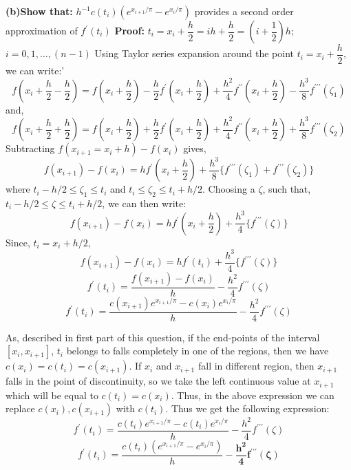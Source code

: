 \documentclass{article}
\renewcommand\part[1]{\vspace{.10in}\textbf{(#1)}}
\begin{document}
  \part{b}\textbf {Show that:} $h^{-1}c(t_i)(e^{x_{i+1}/\pi} - e^{x_i/\pi})$ provides a second order approximation of $f^\prime(t_i)$ \newline
  \textbf{Proof:} $t_i = x_i + \dfrac{h}{2} = ih + \dfrac{h}{2} = (i + \dfrac{1}{2})h$; $i=0,1,\dots,(n-1)$ \newline
  Using Taylor series expansion around the point $t_i = x_i + \dfrac{h}{2}$, we can write:'
  \[f(x_i + \dfrac{h}{2} - \dfrac{h}{2}) = f(x_i + \dfrac{h}{2}) - \dfrac{h}{2}f^\prime(x_i + \dfrac{h}{2}) + \dfrac{h^2}{4}f^{\prime\prime}(x_i + \dfrac{h}{2}) - \dfrac{h^3}{8}f^{\prime\prime\prime}(\zeta_1)\]
  and, 
  \[f(x_i + \dfrac{h}{2} + \dfrac{h}{2}) = f(x_i + \dfrac{h}{2}) + \dfrac{h}{2}f^\prime(x_i + \dfrac{h}{2}) + \dfrac{h^2}{4}f^{\prime\prime}(x_i + \dfrac{h}{2}) + \dfrac{h^3}{8}f^{\prime\prime\prime}(\zeta_2)\]
  Subtracting $f(x_{i+1}=x_i+h) - f(x_{i})$ gives, 
  \[ f(x_{i+1}) - f(x_i) = hf^\prime(x_i + \dfrac{h}{2}) + \dfrac{h^3}{8}\{ f^{\prime\prime\prime}(\zeta_1) + f^{\prime\prime\prime}(\zeta_2)\} \]
  where $t_i - h/2 \leq \zeta_1 \leq t_i$ and $t_i \leq \zeta_2 \leq t_i + h/2$. Choosing a $\zeta$, such that, $t_i - h/2 \leq \zeta \leq t_i + h/2$, we can then write:
  \[ f(x_{i+1}) - f(x_i) = hf^\prime(x_i + \dfrac{h}{2}) + \dfrac{h^3}{4}\{ f^{\prime\prime\prime}(\zeta)\} \]
  Since, $t_i = x_i + h/2$,
  \[ f(x_{i+1}) - f(x_i) = hf^\prime(t_i) + \dfrac{h^3}{4}\{ f^{\prime\prime\prime}(\zeta)\} \]
  \[ f^\prime(t_i) = \dfrac{f(x_{i+1}) - f(x_i)}{h} - \dfrac{h^2}{4}f^{\prime\prime\prime}(\zeta)\]
  \[ f^\prime(t_i) = \dfrac{c(x_{i+1})e^{x_{i+1}/\pi} - c(x_i)e^{x_i/\pi}}{h} - \dfrac{h^2}{4}f^{\prime\prime\prime}(\zeta)\]

  As, described in first part of this question, if the end-points of the interval$[x_i,x_{i+1}]$, $t_i$ belongs to falls completely in one of the regions, then we have $c(x_i) = c(t_i) = c(x_{i+1})$. If $x_i$ and $x_{i+1}$ fall in different region, then $x_{i+1}$ falls in the point of discontinuity, so we take the left continuous value at $x_{i+1}$ which will be equal to $c(t_i) = c(x_i)$. Thus, in the above expression we can replace $c(x_i),c(x_{i+1})$ with $c(t_i)$. Thus we get the following expression:
  \[ f^\prime(t_i) = \dfrac{c(t_i)e^{x_{i+1}/\pi} - c(t_i)e^{x_i/\pi}}{h} - \dfrac{h^2}{4}f^{\prime\prime\prime}(\zeta)\]
  \begin{equation}
   f^\prime(t_i) = \dfrac{c(t_i)(e^{x_{i+1}/\pi} - e^{x_i/\pi})}{h} - \mathbf{\dfrac{h^2}{4}f^{\prime\prime\prime}(\zeta)}
   \label{eq:discont}
  \end{equation}
\end{document}
